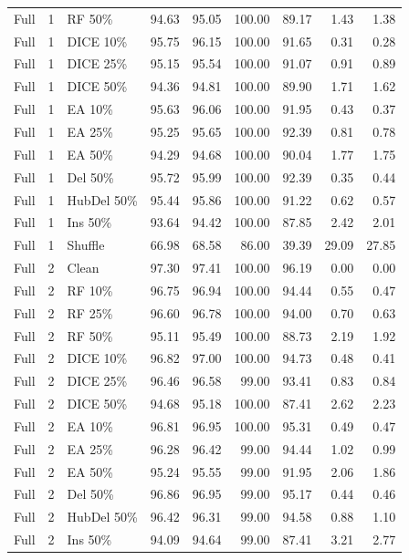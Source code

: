 {\begin{longtable}{rllrrrrrr}
Full & 1 & RF 50\% & 94.63 & 95.05 & 100.00 & 89.17 & 1.43 & 1.38 \\
Full & 1 & DICE 10\% & 95.75 & 96.15 & 100.00 & 91.65 & 0.31 & 0.28 \\
Full & 1 & DICE 25\% & 95.15 & 95.54 & 100.00 & 91.07 & 0.91 & 0.89 \\
Full & 1 & DICE 50\% & 94.36 & 94.81 & 100.00 & 89.90 & 1.71 & 1.62 \\
Full & 1 & EA 10\% & 95.63 & 96.06 & 100.00 & 91.95 & 0.43 & 0.37 \\
Full & 1 & EA 25\% & 95.25 & 95.65 & 100.00 & 92.39 & 0.81 & 0.78 \\
Full & 1 & EA 50\% & 94.29 & 94.68 & 100.00 & 90.04 & 1.77 & 1.75 \\
Full & 1 & Del 50\% & 95.72 & 95.99 & 100.00 & 92.39 & 0.35 & 0.44 \\
Full & 1 & HubDel 50\% & 95.44 & 95.86 & 100.00 & 91.22 & 0.62 & 0.57 \\
Full & 1 & Ins 50\% & 93.64 & 94.42 & 100.00 & 87.85 & 2.42 & 2.01 \\
Full & 1 & Shuffle & 66.98 & 68.58 & 86.00 & 39.39 & 29.09 & 27.85 \\
Full & 2 & Clean & 97.30 & 97.41 & 100.00 & 96.19 & 0.00 & 0.00 \\
Full & 2 & RF 10\% & 96.75 & 96.94 & 100.00 & 94.44 & 0.55 & 0.47 \\
Full & 2 & RF 25\% & 96.60 & 96.78 & 100.00 & 94.00 & 0.70 & 0.63 \\
Full & 2 & RF 50\% & 95.11 & 95.49 & 100.00 & 88.73 & 2.19 & 1.92 \\
Full & 2 & DICE 10\% & 96.82 & 97.00 & 100.00 & 94.73 & 0.48 & 0.41 \\
Full & 2 & DICE 25\% & 96.46 & 96.58 & 99.00 & 93.41 & 0.83 & 0.84 \\
Full & 2 & DICE 50\% & 94.68 & 95.18 & 100.00 & 87.41 & 2.62 & 2.23 \\
Full & 2 & EA 10\% & 96.81 & 96.95 & 100.00 & 95.31 & 0.49 & 0.47 \\
Full & 2 & EA 25\% & 96.28 & 96.42 & 99.00 & 94.44 & 1.02 & 0.99 \\
Full & 2 & EA 50\% & 95.24 & 95.55 & 99.00 & 91.95 & 2.06 & 1.86 \\
Full & 2 & Del 50\% & 96.86 & 96.95 & 99.00 & 95.17 & 0.44 & 0.46 \\
Full & 2 & HubDel 50\% & 96.42 & 96.31 & 99.00 & 94.58 & 0.88 & 1.10 \\
Full & 2 & Ins 50\% & 94.09 & 94.64 & 99.00 & 87.41 & 3.21 & 2.77 \\

\end{longtable}}
